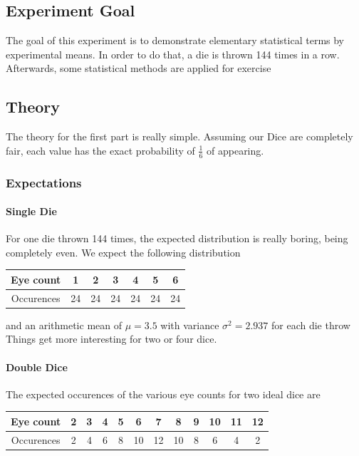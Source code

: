 \documentclass{scrreprt}
\begin{document}
\subsection{Experiment Goal}
The goal of this experiment is to demonstrate elementary statistical terms by experimental means. In order to do that, a die is thrown 144 times in a row. Afterwards, some statistical methods are applied for exercise

\subsection{Theory}
The theory for the first part is really simple. Assuming our Dice are completely fair, each value has the exact probability of $\frac{1}{6}$ of appearing.
 
\subsubsection{Expectations}

\paragraph{Single Die}
For one die thrown 144 times, the expected distribution is really boring, being completely even. We expect the following distribution

\begin{center}
    \begin{tabular}{|c|cccccc|}
    \hline
    Eye count & 1 & 2 & 3 & 4 & 5 & 6\\
    \hline
    Occurences & 24 & 24 & 24 & 24 & 24 & 24\\
    \hline
    \end{tabular}
\end{center}
and an arithmetic mean of $\mu = 3.5$ with variance $\sigma^2 = 2.937$ for each die throw\\

Things get more interesting for two or four dice.

\paragraph{Double Dice}
The expected occurences of the various eye counts for two ideal dice are
\begin{center}
    \begin{tabular}{|c|ccccccccccc|}
    \hline
    Eye count & 2 & 3 & 4 & 5 & 6 & 7 & 8 & 9 & 10 & 11 & 12\\
    \hline
    Occurences & 2 & 4 & 6 & 8 & 10 & 12 & 10 & 8 & 6 & 4 & 2\\
    \hline
    \end{tabular}
\end{center}
\end{document}
